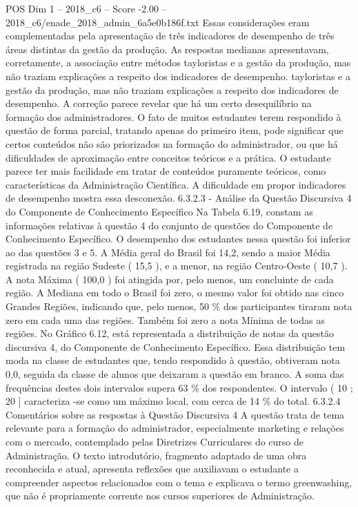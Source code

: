 \begin{textsample}{POS Dim 1 – 2018\_c6 – Score -2.00 – 2018\_c6/enade\_2018\_admin\_6a5e0b186f.txt}
Essas considerações eram complementadas pela apresentação de três indicadores de desempenho de três áreas distintas da gestão da produção.
As respostas medianas apresentavam, corretamente, a associação entre métodos tayloristas e a gestão da produção, mas não traziam explicações a respeito dos indicadores de desempenho. tayloristas e a gestão da produção, mas não traziam explicações a respeito dos indicadores de desempenho.
A correção parece revelar que há um certo desequilíbrio na formação dos administradores.
O fato de muitos estudantes terem respondido à questão de forma parcial, tratando apenas do primeiro item, pode significar que certos conteúdos não são priorizados na formação do administrador, ou que há dificuldades de aproximação entre conceitos teóricos e a prática.
O estudante parece ter mais facilidade em tratar de conteúdos puramente teóricos, como características da Administração Científica.
A dificuldade em propor indicadores de desempenho mostra essa desconexão. 6.3.2.3 - Análise da Questão Discursiva 4 do Componente de Conhecimento Específico Na Tabela 6.19, constam as informações relativas à questão 4 do conjunto de questões do Componente de Conhecimento Específico.
O desempenho dos estudantes nessa questão foi inferior ao das questões 3 e 5.
A Média geral do Brasil foi 14,2, sendo a maior Média registrada na região Sudeste ( 15,5 ), e a menor, na região Centro-Oeste ( 10,7 ).
A nota Máxima ( 100,0 ) foi atingida por, pelo menos, um concluinte de cada região.
A Mediana em todo o Brasil foi zero, o mesmo valor foi obtido nas cinco Grandes Regiões, indicando que, pelo menos, 50 \% dos participantes tiraram nota zero em cada uma das regiões.
Também foi zero a nota Mínima de todas as regiões.
No Gráfico 6.12, está representada a distribuição de notas da questão discursiva 4, do Componente de Conhecimento Específico.
Essa distribuição tem moda na classe de estudantes que, tendo respondido à questão, obtiveram nota 0,0, seguida da classe de alunos que deixaram a questão em branco.
A soma das frequências destes dois intervalos supera 63 \% dos respondentes.
O intervalo ( 10 ; 20 ] caracteriza -se como um máximo local, com cerca de 14 \% do total. 6.3.2.4 Comentários sobre as respostas à Questão Discursiva 4 A questão trata de tema relevante para a formação do administrador, especialmente marketing e relações com o mercado, contemplado pelas Diretrizes Curriculares do curso de Administração.
O texto introdutório, fragmento adaptado de uma obra reconhecida e atual, apresenta reflexões que auxiliavam o estudante a compreender aspectos relacionados com o tema e explicava o termo greenwashing, que não é propriamente corrente nos cursos superiores de Administração.

\end{textsample}
